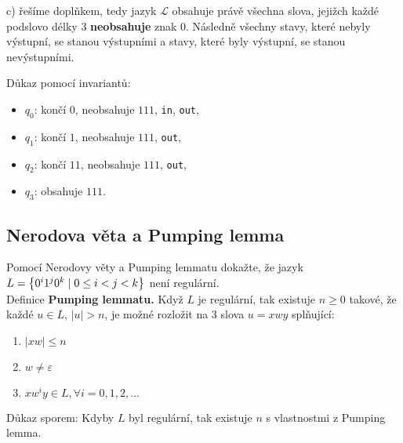 c) řešíme doplňkem, tedy jazyk $\mathcal{L}$ obsahuje právě všechna slova, jejižch každé podslovo délky $3$ \textbf{neobsahuje}
znak $0$. Následně všechny stavy, které nebyly výstupní, se stanou výstupními a stavy, které byly výstupní, se stanou
nevýstupními.


Důkaz pomocí invariantů:
\begin{itemize}[noitemsep]
    \item $q_0$: končí $0$, neobsahuje $111$, \texttt{in}, \texttt{out},
    \item $q_1$: končí $1$, neobsahuje $111$, \texttt{out},
    \item $q_2$: končí $11$, neobsahuje $111$, \texttt{out},
    \item $q_3$: obsahuje $111$.
\end{itemize}

\newpage

\subsection{Nerodova věta a Pumping lemma}
Pomocí Nerodovy věty a Pumping lemmatu dokažte, že jazyk $L = \left\lbrace 0^i 1^j 0^k \mid 0 \leq i < j <k \right\rbrace$ není regulární.\\

\noindent
Definice \textbf{Pumping lemmatu.} Když $L$ je regulární, tak existuje $n \geq 0$ takové, že každé ${u \in L}$,
$|u| > n$, je možné rozložit na 3 slova $u = xwy$ splňující:

\begin{enumerate}[1), noitemsep]
    \item $|xw| \leq n$
    \item $w \not= \varepsilon$
    \item $xw^i y \in L, \forall i = 0, 1, 2, ...$
\end{enumerate}
Důkaz sporem:
Kdyby $L$ byl regulární, tak existuje $n$ s vlastnostmi z Pumping lemma.

